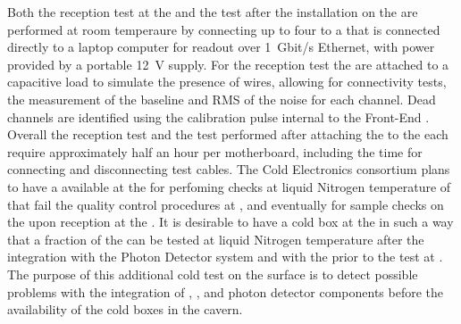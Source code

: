 Both the reception test at the  and the test after the
installation on the  are performed at room temperaure 
by connecting up to four  to a  that is 
connected directly to a laptop computer for readout over 1~Gbit/s 
Ethernet, with power provided by a portable 12~V supply. For 
the reception test the  are attached to a capacitive 
load to simulate the presence of wires, allowing for connectivity 
tests, the measurement of the baseline and RMS of the noise for 
each channel. Dead channels are identified using the calibration 
pulse internal to the Front-End . Overall the reception 
test and the test performed after attaching the  to the 
 each require approximately half an hour per motherboard, 
including  the time for connecting and disconnecting test cables.
The Cold Electronics consortium plans to have a  available
at the  for perfoming checks at liquid Nitrogen temperature
of  that fail the quality control procedures at \surf,
and eventually for sample checks on the  upon reception
at the . It is desirable to have a cold box at the 
in such a way that a fraction of the  can be tested at
liquid Nitrogen temperature after the integration with the Photon
Detector system and with the  prior to the test at 
\surf. The purpose of this additional cold test on the surface is to
detect possible problems with the integration of , ,
and photon detector components before the availability of the cold
boxes in the \surf cavern.

